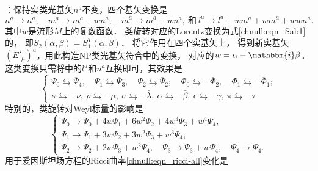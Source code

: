\noindent{}：保持实类光基矢$n^a$不变，四个基矢变换是
\begin{equation*}
    n^a\to n^a,\quad m^a \to m^a + w n^a, \quad \overline{m}^a \to \overline{m}^a + \bar{w} n^a,
    \ \text{和}\ l^a \to l^a + \bar{w} m^a + w \overline{m}^a + w\bar{w} n^a .
\end{equation*}
其中$w$是流形$M$上的复数函数．
类旋转对应的Lorentz变换为式\eqref{chnull:eqn_Sab1}的，
即$S_2( {\alpha ,\beta } ) = S_1^T( {\alpha ,\beta } )$．
将它作用在四个实基矢上，
得到新实基矢$(E'_\mu)^a$，用此构造NP类光基矢符合中的变换，
对应的$w=\alpha -\mathbbm{i} \beta$．
这类变换只需将中的$l^a$和$n^a$互换即可，其效果是
\begin{equation}\label{chnull:eqn_Weyl-Spin-II}
    \begin{cases}
        \Psi_0 \leftrightarrows \overline{\Psi}_4 ,\quad
        \Psi_1 \leftrightarrows \overline{\Psi}_3 ,\quad
        \Psi_2 \leftrightarrows \overline{\Psi}_2 ;\quad
        \Phi_0 \leftrightarrows -\overline{\Phi}_2 ,\quad
        \Phi_1 \leftrightarrows -\overline{\Phi}_1 ;\\
        \kappa \leftrightarrows -\bar{\nu}, \
        \rho   \leftrightarrows -\bar{\mu}, \
        \sigma \leftrightarrows -\bar{\lambda}, \
        \alpha \leftrightarrows -\bar{\beta},\
        \epsilon\leftrightarrows-\bar{\gamma},\
        \pi    \leftrightarrows -\bar{\tau}
    \end{cases}
\end{equation}
特别的，\fbox{乙}类旋转对Weyl标量的影响是
\begin{equation}\label{chnull:eqn_Weyl-II}
    \begin{cases}
        \Psi_{0} \to \Psi_{0} + 4 w \Psi_{1} + 6 w^2 \Psi_{2}
        + 4 w^3 \Psi_{3} + w^4 \Psi_{4}, \\
        \Psi_{1} \to \Psi_{1} + 3 w \Psi_{2} + 3 w^2 \Psi_{3} + w^3 \Psi_{4}, \\
        \Psi_{2} \to \Psi_{2} + 2 w \Psi_{3} + w^2 \Psi_{4}, \quad
        \Psi_{3} \to \Psi_{3} + w \Psi_{4}, \quad \Psi_{4} \to \Psi_{4} .
    \end{cases}
\end{equation}
用于爱因斯坦场方程的Ricci曲率\eqref{chnull:eqn_ricci-all}变化是
